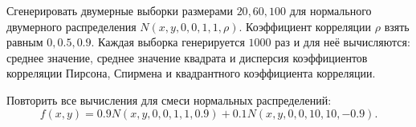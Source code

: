 Сгенерировать двумерные выборки размерами $20, 60, 100$
для нормального двумерного распределения $N(x, y, 0, 0, 1, 1, \rho)$.
Коэффициент корреляции $\rho$ взять равным $0, 0.5, 0.9$.
Каждая выборка генерируется $1000$ раз и для неё вычисляются: среднее значение,
среднее значение квадрата и дисперсия коэффициентов корреляции Пирсона, Спирмена и квадрантного коэффициента корреляции.

Повторить все вычисления для смеси нормальных распределений:
\begin{equation}
    f(x, y) = 0.9{N}(x, y, 0, 0, 1, 1, 0.9) + 0.1{N}(x, y, 0, 0, 10, 10,-0.9).
    \label{eq:mixed_normal}
\end{equation}